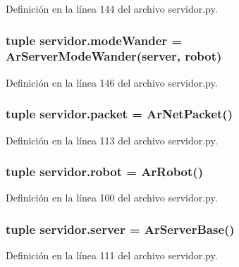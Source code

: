 Definición en la línea 144 del archivo servidor.py.

\hypertarget{namespaceservidor_ae22efed138dafc7284a3f71676a6757f}{
\subsubsection[{modeWander}]{\setlength{\rightskip}{0pt plus 5cm}tuple {\bf servidor.modeWander} = ArServerModeWander({\bf server}, {\bf robot})}}
\label{namespaceservidor_ae22efed138dafc7284a3f71676a6757f}


Definición en la línea 146 del archivo servidor.py.

\hypertarget{namespaceservidor_a159e1bd236b55d72f3fd3cb94afc7650}{
\subsubsection[{packet}]{\setlength{\rightskip}{0pt plus 5cm}tuple {\bf servidor.packet} = ArNetPacket()}}
\label{namespaceservidor_a159e1bd236b55d72f3fd3cb94afc7650}


Definición en la línea 113 del archivo servidor.py.

\hypertarget{namespaceservidor_a20c40528942a814c3ba639d6fdf80c34}{
\subsubsection[{robot}]{\setlength{\rightskip}{0pt plus 5cm}tuple {\bf servidor.robot} = ArRobot()}}
\label{namespaceservidor_a20c40528942a814c3ba639d6fdf80c34}


Definición en la línea 100 del archivo servidor.py.

\hypertarget{namespaceservidor_adfced13b57fb69c12f8ab5a84d1a2356}{
\subsubsection[{server}]{\setlength{\rightskip}{0pt plus 5cm}tuple {\bf servidor.server} = ArServerBase()}}
\label{namespaceservidor_adfced13b57fb69c12f8ab5a84d1a2356}


Definición en la línea 111 del archivo servidor.py.

